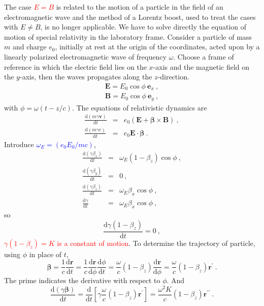 \documentclass[12pt,a4paper]{article}
\renewcommand{\vec}[1]{\boldsymbol{#1}}
\newcommand{\dif}{\mathrm{d}}
\begin{document}
The case \textcolor{red}{$E = B$} is related to the motion of a particle in the field of an electromagnetic wave and the method of a Lorentz boost, used to treat the cases with $E \neq B$, is no longer applicable. We have to solve directly the equation of motion of special relativity in the laboratory frame. Consider a particle of mass $m$ and charge $e_0$, initially at rest at the origin of the coordinates, acted upon by a linearly polarized electromagnetic wave of frequency $\omega$.  Choose a frame of reference in which the electric field lies on the $x$-axis and the magnetic field on the $y$-axis, then the waves propagates along the $z$-direction. 
\begin{eqnarray*}
\vec{E} = E_0 \cos \phi ~\vec{e}_x ~,\\
\vec{B} = E_0 \cos \phi ~\vec{e}_y ~,
\end{eqnarray*}
with $\phi = \omega (t-z/c)$. The equations of relativistic dynamics are
\begin{eqnarray*}
\frac{\dif (m\gamma \vec{v})}{\dif t} &=& e_0 (\vec{E} +\vec{\beta} \times \vec{B}) ~, \\
\frac{\dif (m\gamma c)}{\dif t} &=& e_0 \vec{E} \cdot \vec{\beta} ~.
\end{eqnarray*}
Introduce \textcolor{blue}{$\omega_E = (e_0 E_0/mc)$},
\begin{eqnarray*}
\frac{\dif (\gamma \beta_x)}{\dif t} &=& \omega_E (1-\beta_z) \cos \phi ~, \\
\frac{\dif (\gamma \beta_y)}{\dif t}  &=& 0 ~, \\
\frac{\dif (\gamma \beta_z)}{\dif t}  &=& \omega_E \beta_x \cos \phi ~, \\
\frac{\dif \gamma}{\dif t}  &=& \omega_E \beta_x \cos \phi ~,
\end{eqnarray*}
so
\begin{equation}
\frac{\dif \gamma(1-\beta_z)}{\dif t}  = 0 ~,
\end{equation}
\textcolor{red}{$\gamma(1-\beta_z) = K$  is a constant of motion}.
To determine the trajectory of particle, using $\phi$ in place of $t$,
\begin{equation*}
\vec{\beta} = \frac{1}{c} \frac{\dif \vec{r}}{\dif t} = \frac{1}{c} \frac{\dif \vec{r}}{\dif \phi}  \frac{\dif \phi}{\dif t} = \frac{\omega}{c} (1-\beta_z) \frac{\dif \vec{r}}{\dif \phi} = \frac{\omega}{c} (1-\beta_z) \vec{r}^\prime ~.
\end{equation*}
The prime indicates the derivative with respect to $\phi$. And
\begin{equation*}
\frac{\dif (\gamma \vec{\beta})}{\dif t} = \frac{\dif}{\dif t} \left[\gamma \frac{\omega}{c} (1-\beta_z) \vec{r}^\prime \right] =  \frac{\omega^2 K}{c} (1-\beta_z) \vec{r}^{\prime\prime} ~.
\end{equation*}
\end{document}
